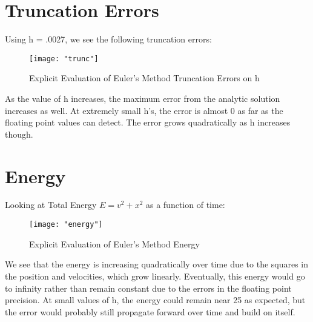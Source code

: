 \documentclass{article}
\begin{document}
\section{Truncation Errors}
Using h = .0027, we see the following truncation errors:
\begin{figure}[h!]
	\centering
	\texttt{[image: "trunc"]}
	\caption{Explicit Evaluation of Euler's Method Truncation Errors on h}
\end{figure} 
\FloatBarrier

As the value of h increases, the maximum error from the analytic solution increases as well. At extremely small h's, the error is almost 0 as far as the
floating point values can detect. The error grows quadratically as h increases though.

\section{Energy}
Looking at Total Energy $E = v^2 + x^2$ as a function of time:
\begin{figure}[h!]
	\centering
	\texttt{[image: "energy"]}
	\caption{Explicit Evaluation of Euler's Method Energy}
\end{figure} 
\FloatBarrier
We see that the energy is increasing quadratically over time due to the squares in the position and velocities, which grow linearly. Eventually, this energy
would go to infinity rather than remain constant due to the errors in the floating point precision. At small values of h, the energy could remain near 25 
as expected, but the error would probably still propagate forward over time and build on itself.
\end{document}
